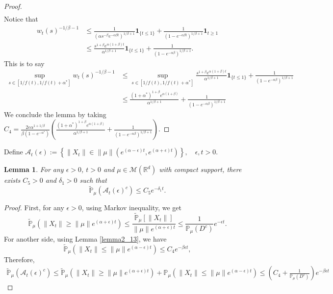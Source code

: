\documentclass[12pt,oneside,english]{amsart}
\theoremstyle{plain}
\newtheorem{lem}[thm]{Lemma}
\theoremstyle{definition}
\numberwithin{equation}{section}
\begin{document}
\begin{proof}
\begin{align*}
\end{align*}
Notice that
\begin{align*}
    w_t(s)^{-1/\beta-1}&\leq \frac{1}{(\alpha s^{-\beta}e^{-\alpha \beta t})^{1/
    \beta+1}}\mathbf{1}_{\{t\leq 1\}}+\frac{1}{(1-e^{-\alpha\beta t})^{1/\beta+1}}\mathbf{1}_{t\geq 1}\\
    &\leq \frac{s^{1+\beta}e^{\alpha(1+\beta)t}}{\alpha^{1/\beta +1}}\mathbf{1}_{\{t\leq 1\}}+\frac{1}{(1-e^{-\alpha\beta })^{1/\beta+1}}.
\end{align*}
This is to say
\begin{align*}
    \sup_{s\in [1/f(t),1/f(t)+\alpha^*]}w_t(s)^{-1/\beta-1}&\leq\sup_{s\in [1/f(t),1/f(t)+\alpha^*]}\frac{s^{1+\beta}e^{\alpha(1+\beta)t}}{\alpha^{1/\beta +1}}\mathbf{1}_{\{t\leq 1\}}+\frac{1}{(1-e^{-\alpha\beta })^{1/\beta+1}}\\
    &\leq \frac{(1+\alpha^*)^{1+\beta}e^{\alpha(1+\beta)}}{\alpha^{1/\beta+1}}+\frac{1}{(1-e^{-\alpha\beta })^{1/\beta+1}}
\end{align*}
We conclude the lemma by taking $C_4= \frac{2 e \alpha^{1+1/\beta}}{\beta (1-e^{-\alpha^*})}\left(\frac{(1+\alpha^*)^{1+\beta}e^{\alpha(1+\beta)}}{\alpha^{1/\beta+1}}+\frac{1}{(1-e^{-\alpha\beta })^{1/\beta+1}}\right)$.
\end{proof}
Define $\mathcal{A}_t(\epsilon):=\left\{ \|X_t\|\in \|\mu\|\left(e^{(\alpha-\epsilon)t},e^{(\alpha+\epsilon)t}\right)\right\},\quad \epsilon,t>0$.
\begin{lem}\label{lemma28}
  For any $\epsilon>0$, $t>0$ and $\mu \in \mathcal{M}(\mathbb{R}^d)$ with compact support, there exists $C_5>0$ and $\delta_1>0$ such that
  $$\mathbb{\tilde{P}}_{\mu}\left(\mathcal{A}_t(\epsilon)^c\right)\leq C_5 e^{-\delta_1 t}.$$
\end{lem}

\begin{proof}
    First, for any $\epsilon>0$, using Markov inequality, we get
    $$\mathbb{\tilde{P}}_{\mu}(\|X_t\|\geq\|\mu\|e^{(\alpha+\epsilon)t})\leq\frac{\mathbb{\tilde{P}}_{\mu}[\|X_t\|]}{\|\mu\|e^{(\alpha+\epsilon)t}}\leq \frac{1}{\mathbb{P}_{\mu}(D^c)}e^{-\epsilon t}.$$
    For another side, using Lemma \ref{lemma2_13}, we have
    $$\mathbb{\tilde{P}}_{\mu}\left(\|X_t\|\leq \|\mu\|e^{(\alpha-\epsilon)t}\right)\leq C_4 e^{-\beta\epsilon t}, $$
Therefore,
\begin{align*}
    \mathbb{\tilde{P}}_{\mu}\left(\mathcal{A}_t(\epsilon)^c\right)\leq \mathbb{\tilde{P}}_{\mu}(\|X_t\|\geq\|\mu\|e^{(\alpha+\epsilon)t})+\mathbb{P}_{\mu}\left(\|X_t\|\leq \|\mu\|e^{(\alpha-\epsilon)t}\right)\leq(C_4+\frac{1}{\mathbb{P}_{\mu}(D^c)})e^{-\beta \epsilon t }
\end{align*}
\end{proof}
\end{document}
